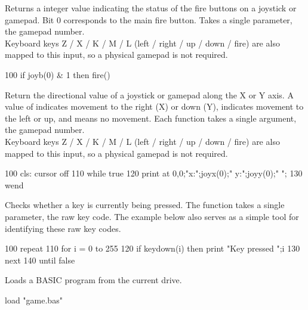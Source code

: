 \begin{entry}
Returns a integer value indicating the status of the fire buttons on a joystick or gamepad. Bit 0 corresponds to the main fire button. Takes a single parameter, the gamepad number.\\

Keyboard keys Z / X / K / M / L (left / right / up / down / fire) are also mapped to this input, so a physical gamepad is not required.

\begin{lstexample}
100 if joyb(0) & 1 then fire()
\end{lstexample}
\end{entry}

\begin{entry}
Return the directional value of a joystick or gamepad along the X or Y axis. A value of  indicates movement to the right (X) or down (Y),  indicates movement to the left or up, and  means no movement. Each function takes a single argument, the gamepad number.\\

Keyboard keys Z / X / K / M / L (left / right / up / down / fire) are also mapped to this input, so a physical gamepad is not required.

\begin{lstexample}
100   cls: cursor off
110   while true
120     print at 0,0;"x:";joyx(0);" y:";joyy(0);"  ";
130   wend
\end{lstexample}
\end{entry}

\begin{entry}
Checks whether a key is currently being pressed. The function takes a single parameter, the raw key code. The example below also serves as a simple tool for identifying these raw key codes.

\begin{lstexample}
100 repeat
110   for i = 0 to 255
120     if keydown(i) then print "Key pressed ";i
130   next
140 until false
\end{lstexample}
\end{entry}

\begin{entry}
Loads a BASIC program from the current drive.

\begin{lstexample}
load "game.bas"
\end{lstexample}
\end{entry}

